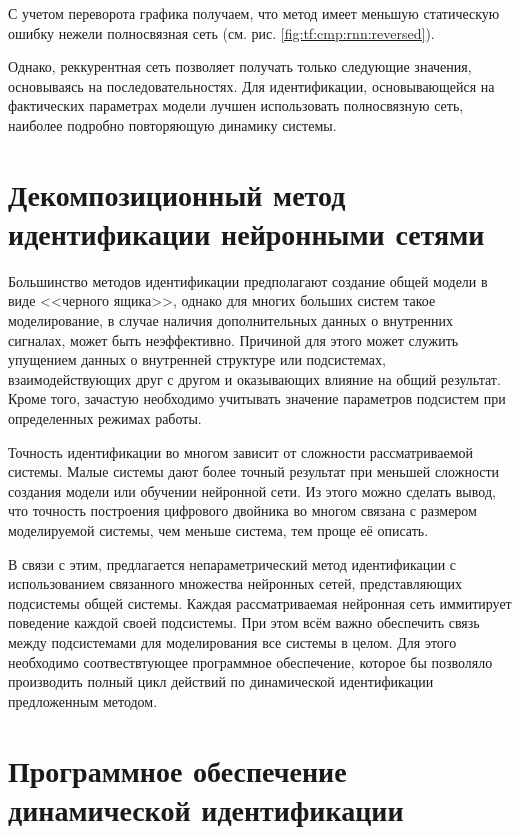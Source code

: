 С учетом переворота графика получаем, что метод имеет меньшую статическую
ошибку нежели полносвязная сеть (см. рис. \ref{fig:tf:cmp:rnn:reversed}).

Однако, реккурентная сеть позволяет получать только следующие значения,
основываясь на последовательностях. Для идентификации, основывающейся на
фактических параметрах модели лучшен использовать полносвязную сеть, наиболее подробно повторяющую динамику системы. 

\section{Декомпозиционный метод идентификации нейронными сетями}
Большинство методов идентификации предполагают создание общей модели в виде
<<черного ящика>>, однако для многих больших систем такое моделирование, в
случае наличия дополнительных данных о внутренних сигналах, может быть
неэффективно. Причиной для этого может служить упущением данных о внутренней
структуре или подсистемах, взаимодействующих друг с другом и оказывающих
влияние на общий результат. Кроме того, зачастую необходимо учитывать значение
параметров подсистем при определенных режимах работы.

Точность идентификации во многом зависит от сложности рассматриваемой системы.
Малые системы дают более точный результат при меньшей сложности создания модели
или обучении нейронной сети. Из этого можно сделать вывод, что точность
построения цифрового двойника во многом связана с размером моделируемой
системы, чем меньше система, тем проще её описать. 

В связи с этим, предлагается непараметрический метод идентификации с
использованием связанного множества нейронных сетей, представляющих подсистемы
общей системы. Каждая рассматриваемая нейронная сеть иммитирует поведение
каждой своей подсистемы. При этом всём важно обеспечить связь между
подсистемами для моделирования все системы в целом. Для этого необходимо
соотвествтующее программное обеспечение, которое бы позволяло производить
полный цикл действий по динамической идентификации предложенным методом. 

\section{Программное обеспечение динамической идентификации}


